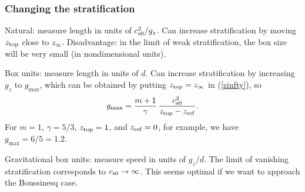 \documentclass[12pt,twoside,notitlepage,a4paper]{article}
\begin{document}
\subsubsection{Changing the stratification}

Natural: measure length in units of $c_{\rm s0}^2/g_z$.
Can increase stratification by moving $z_{\rm top}$ close to $z_\infty$.
Disadvantage: in the limit of weak stratification, the box size will
be very small (in nondimensional units).

Box units: measure length in units of $d$.
Can increase stratification by increasing $g_z$ to
$g_{\max}$, which can be obtained by putting $z_{\rm top}=z_\infty$
in (\ref{zinfty}), so
\begin{equation}\label{zinfty}
g_{\max}={m+1\over\gamma}\,{c_{\rm s0}^2\over z_{\rm top}-z_{\rm ref}}.
\end{equation}
For $m=1$, $\gamma=5/3$, $z_{\rm top}=1$, and $z_{\rm ref}=0$, for
example, we have $g_{\max}=6/5=1.2$.

Gravitational box units: measure speed in units of $g_z/d$.
The limit of vanishing stratification corresponds to
$c_{\rm s0}\rightarrow\infty$. This seems optimal if we want
to approach the Boussinesq case.


\printindex
\

\vfill\bigskip{}
\end{document}
